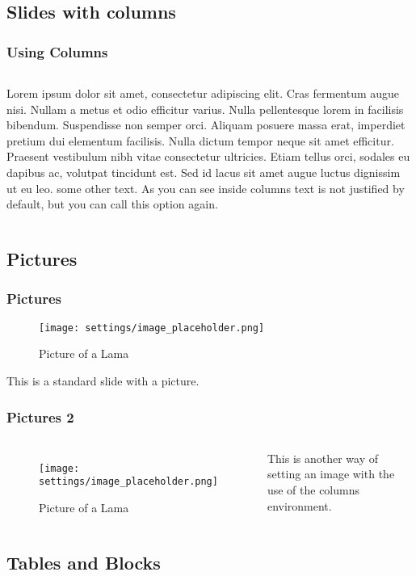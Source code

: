\subsection{Slides with columns}
\begin{frame}
    \frametitle{Using Columns}
    \begin{columns}
            Lorem ipsum dolor sit amet, consectetur adipiscing elit. Cras fermentum augue nisi. Nullam a metus et odio efficitur varius. Nulla pellentesque lorem in facilisis bibendum. Suspendisse non semper orci. Aliquam posuere massa erat, imperdiet pretium dui elementum facilisis. Nulla dictum tempor neque sit amet efficitur. Praesent vestibulum nibh vitae consectetur ultricies. Etiam tellus orci, sodales eu dapibus ac, volutpat tincidunt est. Sed id lacus sit amet augue luctus dignissim ut eu leo.
            \justify
            some other text. As you can see inside columns text is not justified by default, but you can call this option again.
    \end{columns}
\end{frame}

\subsection{Pictures}
\begin{frame}
    \frametitle{Pictures}
    \begin{figure}
        \texttt{[image: settings/image\_placeholder.png]}
        \caption{Picture of a Lama}
    \end{figure}
    This is a standard slide with a picture.
\end{frame}

\begin{frame}
    \frametitle{Pictures 2}
    \begin{columns}
            \begin{figure}
                \texttt{[image: settings/image\_placeholder.png]}
                \caption{Picture of a Lama}
            \end{figure}
        \justify
        This is another way of setting an image with the use of the columns environment.
    \end{columns}
\end{frame}

\subsection{Tables and Blocks}

